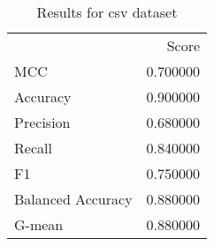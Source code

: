 \begin{table}
\caption{Results for csv dataset}
\begin{tabular}{lr}
 & Score \\
MCC & 0.700000 \\
Accuracy & 0.900000 \\
Precision & 0.680000 \\
Recall & 0.840000 \\
F1 & 0.750000 \\
Balanced Accuracy & 0.880000 \\
G-mean & 0.880000 \\
\end{tabular}
\end{table}
